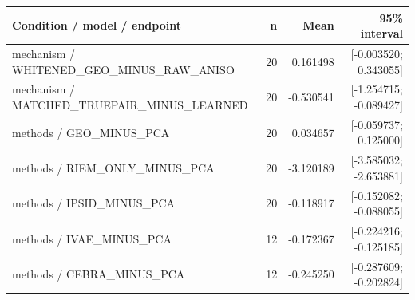 \begin{longtable}{p{.56\linewidth}rrr}
\toprule Condition / model / endpoint & n & Mean & 95\% interval\\\midrule
mechanism / WHITENED\_GEO\_MINUS\_RAW\_ANISO & 20 & 0.161498 & [-0.003520; 0.343055] \\
mechanism / MATCHED\_TRUEPAIR\_MINUS\_LEARNED & 20 & -0.530541 & [-1.254715; -0.089427] \\
methods / GEO\_MINUS\_PCA & 20 & 0.034657 & [-0.059737; 0.125000] \\
methods / RIEM\_ONLY\_MINUS\_PCA & 20 & -3.120189 & [-3.585032; -2.653881] \\
methods / IPSID\_MINUS\_PCA & 20 & -0.118917 & [-0.152082; -0.088055] \\
methods / IVAE\_MINUS\_PCA & 12 & -0.172367 & [-0.224216; -0.125185] \\
methods / CEBRA\_MINUS\_PCA & 12 & -0.245250 & [-0.287609; -0.202824] \\
\bottomrule\end{longtable}
